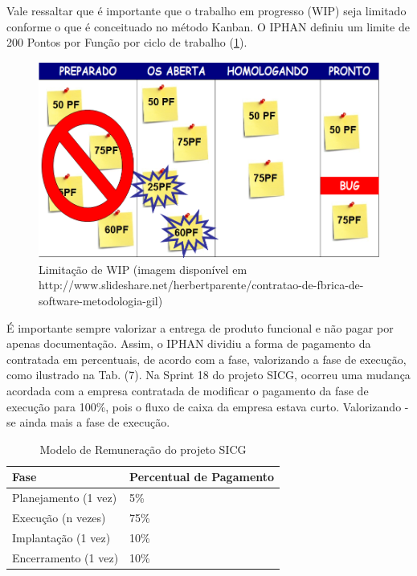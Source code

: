Vale ressaltar que é importante que o trabalho em progresso (WIP) seja limitado conforme o que é conceituado no método Kanban. O IPHAN definiu um limite de 200 Pontos por Função por ciclo de trabalho (\ref{kanban4}). 

\begin{figure}[h]
		\centering
		
			\includegraphics[scale=0.5]{figuras/kanbanIPHAN4.png}
		\caption{Limitação de WIP (imagem disponível em http://www.slideshare.net/herbertparente/contratao-de-fbrica-de-software-metodologia-gil)}
		\label{kanban4}
\end{figure}

É importante sempre valorizar a entrega de produto funcional e não pagar por apenas documentação. Assim, o IPHAN dividiu a forma de pagamento da contratada em percentuais, de acordo com a fase, valorizando a fase de execução, como ilustrado na Tab. (7). Na Sprint 18 do projeto SICG, ocorreu uma mudança acordada com a empresa contratada de modificar o pagamento da fase de execução para 100\%, pois o fluxo de caixa da empresa estava curto. Valorizando - se ainda mais a fase de execução.


\begin{table}[H]
\center
\footnotesize
\begin{tabular}{|p{6cm}|p{6cm}|}
  \hline
   \textbf{Fase} & \textbf{Percentual de Pagamento}\\
    \hline
   Planejamento (1 vez) & 5\%\\
   \hline    
   Execução (n vezes) & 75\%\\
    \hline
   Implantação (1 vez) & 10\%\\
   \hline
   Encerramento (1 vez) & 10\%\\
   \hline
\end{tabular}
\caption{Modelo de Remuneração do projeto SICG}
\end{table}


